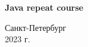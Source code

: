 \documentclass{article}
\begin{document}
\begin{center}
    \Large
   
    \vspace{0.5cm}
    \large
  
    \vspace{1cm}
    \Large
    \textbf{Java repeat course} \\
   
    \large
    \vspace{8cm}

    \begin{minipage}{.33\textwidth}
    \end{minipage}
    \hfill
    \begin{minipage}{.4\textwidth}
    
        
    \end{minipage}
    \vfill
Санкт-Петербург\\ 2023 г.
\end{center}

\newpage
\end{document}
